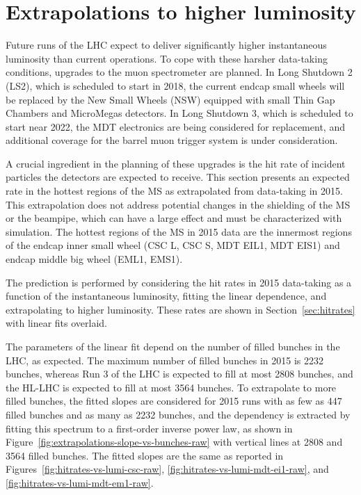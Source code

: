 \section{Extrapolations to higher luminosity}
\label{sec:extrapolations}

Future runs of the LHC expect to deliver significantly higher instantaneous luminosity than current operations. To cope with these harsher data-taking conditions, upgrades to the muon spectrometer are planned. In Long Shutdown 2 (LS2), which is scheduled to start in 2018, the current endcap small wheels will be replaced by the New Small Wheels (NSW) equipped with small Thin Gap Chambers and MicroMegas detectors. In Long Shutdown 3, which is scheduled to start near 2022, the MDT electronics are being considered for replacement, and additional coverage for the barrel muon trigger system is under consideration.

A crucial ingredient in the planning of these upgrades is the hit rate of incident particles the detectors are expected to receive. This section presents an expected rate in the hottest regions of the MS as extrapolated from data-taking in 2015. This extrapolation does not address potential changes in the shielding of the MS or the beampipe, which can have a large effect and must be characterized with simulation. The hottest regions of the MS in 2015 data are the innermost regions of the endcap inner small wheel (CSC L, CSC S, MDT EIL1, MDT EIS1) and endcap middle big wheel (EML1, EMS1).

The prediction is performed by considering the hit rates in 2015 data-taking as a function of the instantaneous luminosity, fitting the linear dependence, and extrapolating to higher luminosity. These rates are shown in Section~\ref{sec:hitrates} with linear fits overlaid.

The parameters of the linear fit depend on the number of filled bunches in the LHC, as expected. The maximum number of filled bunches in 2015 is 2232 bunches, whereas Run 3 of the LHC is expected to fill at most 2808 bunches, and the HL-LHC is expected to fill at most 3564 bunches. To extrapolate to more filled bunches, the fitted slopes are considered for 2015 runs with as few as 447 filled bunches and as many as 2232 bunches, and the dependency is extracted by fitting this spectrum to a first-order inverse power law, as shown in Figure~\ref{fig:extrapolations-slope-vs-bunches-raw} with vertical lines at 2808 and 3564 filled bunches. The fitted slopes are the same as reported in Figures~\ref{fig:hitrates-vs-lumi-csc-raw}, \ref{fig:hitrates-vs-lumi-mdt-ei1-raw}, and \ref{fig:hitrates-vs-lumi-mdt-em1-raw}.


